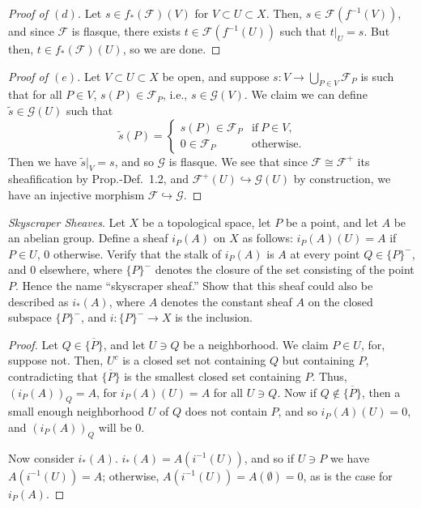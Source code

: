 \documentclass[10pt]{article}
\theoremstyle{definition}
\theoremstyle{remark}
\numberwithin{equation}{section}
\numberwithin{figure}{subsubsection}
\begin{document}
\begin{proof}[Proof of $(d)$]
  Let $s \in f_*(\mathscr{F})(V)$ for $V \subset U \subset X$. Then, $s \in \mathscr{F}(f^{-1}(V))$, and since $\mathscr{F}$ is flasque, there exists $t \in \mathscr{F}(f^{-1}(U))$ such that $t\vert_U = s$. But then, $t \in f_*(\mathscr{F})(U)$, so we are done.
\end{proof}
\begin{proof}[Proof of $(e)$]
  Let $V \subset U \subset X$ be open, and suppose $s\colon V \to \bigcup_{P \in V} \mathscr{F}_P$ is such that for all $P \in V$, $s(P) \in \mathscr{F}_P$, i.e., $s \in \mathscr{G}(V)$. We claim we can define $\tilde{s} \in \mathscr{G}(U)$ such that
  \begin{equation*}
    \tilde{s}(P) = \begin{cases}
      s(P) \in \mathscr{F}_P & \text{if}~P \in V,\\
      0 \in \mathscr{F}_P & \text{otherwise}.
    \end{cases}
  \end{equation*}
  Then we have $\tilde{s}\vert_V = s$, and so $\mathscr{G}$ is flasque. We see that since $\mathscr{F} \cong \mathscr{F}^+$ its sheafification by Prop.-Def.~1.2, and $\mathscr{F}^+(U) \hookrightarrow \mathscr{G}(U)$ by construction, we have an injective morphism $\mathscr{F} \hookrightarrow \mathscr{G}$.
\end{proof}

\begin{problem}
  \emph{Skyscraper Sheaves}. Let $X$ be a topological space, let $P$ be a point, and let $A$ be an abelian group. Define a sheaf $i_P(A)$ on $X$ as follows: $i_P(A)(U) = A$ if $P \in U$, $0$ otherwise. Verify that the stalk of $i_P(A)$ is $A$ at every point $Q \in \{P\}^-$, and $0$ elsewhere, where $\{P\}^-$ denotes the closure of the set consisting of the point $P$. Hence the name ``skyscraper sheaf.'' Show that this sheaf could also be described as $i_*(A)$, where $A$ denotes the constant sheaf $A$ on the closed subspace $\{P\}^-$, and $i\colon\{P\}^- \to X$ is the inclusion.
\end{problem}
\begin{proof}
  Let $Q \in \overline{\{P\}}$, and let $U \ni Q$ be a neighborhood. We claim $P \in U$, for, suppose not. Then, $U^c$ is a closed set not containing $Q$ but containing $P$, contradicting that $\overline{\{P\}}$ is the smallest closed set containing $P$. Thus, $(i_P(A))_Q = A$, for $i_P(A)(U) = A$ for all $U \ni Q$. Now if $Q \notin \overline{\{P\}}$, then a small enough neighborhood $U$ of $Q$ does not contain $P$, and so $i_P(A)(U) = 0$, and $(i_P(A))_Q$ will be $0$.
  \par Now consider $i_*(A)$. $i_*(A) = A(i^{-1}(U))$, and so if $U \ni P$ we have $A(i^{-1}(U)) = A$; otherwise, $A(i^{-1}(U)) = A(\emptyset) = 0$, as is the case for $i_P(A)$.
\end{proof}
\end{document}
